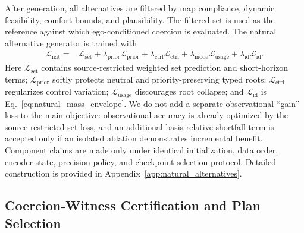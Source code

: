 \documentclass[10pt]{article}
\begin{document}
After generation, all alternatives are filtered by map compliance, dynamic feasibility, comfort bounds, and plausibility. The filtered set is used as the reference against which ego-conditioned coercion is evaluated. The natural alternative generator is trained with
\begin{equation}
\begin{aligned}
    \mathcal{L}_{\mathrm{nat}}
    ={}&
    \mathcal{L}_{\mathrm{set}}
    +\lambda_{\mathrm{prior}}\mathcal{L}_{\mathrm{prior}}
    +\lambda_{\mathrm{ctrl}}\mathcal{L}_{\mathrm{ctrl}}
    +\lambda_{\mathrm{mode}}\mathcal{L}_{\mathrm{usage}}
    +\lambda_{\mathrm{id}}\mathcal{L}_{\mathrm{id}}.
\end{aligned}
\end{equation}
Here $\mathcal{L}_{\mathrm{set}}$ contains source-restricted weighted set prediction and short-horizon terms; $\mathcal{L}_{\mathrm{prior}}$ softly protects neutral and priority-preserving typed roots; $\mathcal{L}_{\mathrm{ctrl}}$ regularizes control variation; $\mathcal{L}_{\mathrm{usage}}$ discourages root collapse; and $\mathcal{L}_{\mathrm{id}}$ is Eq.~\eqref{eq:natural_mass_envelope}. We do not add a separate observational ``gain'' loss to the main objective: observational accuracy is already optimized by the source-restricted set loss, and an additional basis-relative shortfall term is accepted only if an isolated ablation demonstrates incremental benefit. Component claims are made only under identical initialization, data order, encoder state, precision policy, and checkpoint-selection protocol. Detailed construction is provided in Appendix~\ref{app:natural_alternatives}.

\subsection{Coercion-Witness Certification and Plan Selection}
\label{sec:method_certification}
\end{document}
